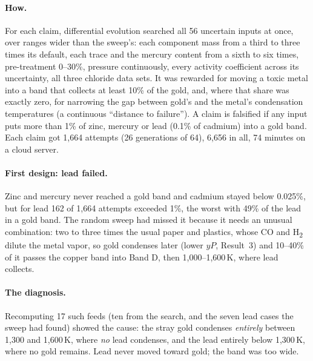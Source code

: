 \documentclass[11pt,a4paper]{article}
\begin{document}
\paragraph{How.} For each claim, differential evolution \citep{storn1997} searched all 56 uncertain inputs at once, over ranges wider than the sweep's: each component mass from a third to three times its default, each trace and the mercury content from a sixth to six times, pre-treatment 0--30\%, pressure continuously, every activity coefficient across its uncertainty, all three chloride data sets. It was rewarded for moving a toxic metal into a band that collects at least 10\% of the gold, and, where that share was exactly zero, for narrowing the gap between gold's and the metal's condensation temperatures (a continuous ``distance to failure''). A claim is falsified if any input puts more than 1\% of zinc, mercury or lead (0.1\% of cadmium) into a gold band. Each claim got 1,664 attempts (26 generations of 64), 6,656 in all, 74 minutes on a cloud server.

\paragraph{First design: lead failed.} Zinc and mercury never reached a gold band and cadmium stayed below 0.025\%, but for lead 162 of 1,664 attempts exceeded 1\%, the worst with 49\% of the lead in a gold band. The random sweep had missed it because it needs an unusual combination: two to three times the usual paper and plastics, whose CO and H\textsubscript{2} dilute the metal vapor, so gold condenses later (lower $yP$, Result~3) and 10--40\% of it passes the copper band into Band D, then 1,000--1,600\,K, where lead collects.

\paragraph{The diagnosis.} Recomputing 17 such feeds (ten from the search, and the seven lead cases the sweep had found) showed the cause: the stray gold condenses \emph{entirely} between 1,300 and 1,600\,K, where \emph{no} lead condenses, and the lead entirely below 1,300\,K, where no gold remains. Lead never moved toward gold; the band was too wide.
\end{document}
